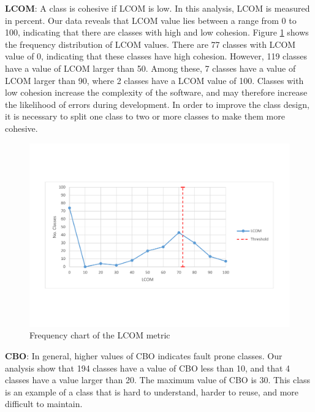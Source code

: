 
\textbf{LCOM}: A class is cohesive if LCOM is low. In this analysis, LCOM is measured in percent. Our data reveals that LCOM value lies between a range from 0 to 100, indicating that there are classes with high and low cohesion. Figure \ref{fig:lcomdistribution} shows the frequency distribution of LCOM values. There are 77 classes with LCOM value of 0, indicating that these classes have high cohesion. However, 119 classes have a value of LCOM larger than 50. Among these, 7 classes have a value of LCOM larger than 90, where 2 classes have a LCOM value of 100. Classes with low cohesion increase the complexity of the software, and may therefore increase the likelihood of errors during development. In order to improve the class design, it is necessary to split one class to two or more classes to make them more cohesive.


\begin{figure}[ht!]
	\centering
	\includegraphics[width=\textwidth]{images/threshold/lcom.pdf}
	\caption{Frequency chart of the LCOM metric}
	\label{fig:lcomdistribution}
\end{figure}



\textbf{CBO}: In general, higher values of CBO indicates fault prone classes. Our analysis show that 194 classes have a value of CBO less than 10, and that 4 classes have a value larger than 20. The maximum value of CBO is 30. This class is an example of a class that is hard to understand, harder to reuse, and more difficult to maintain. 


